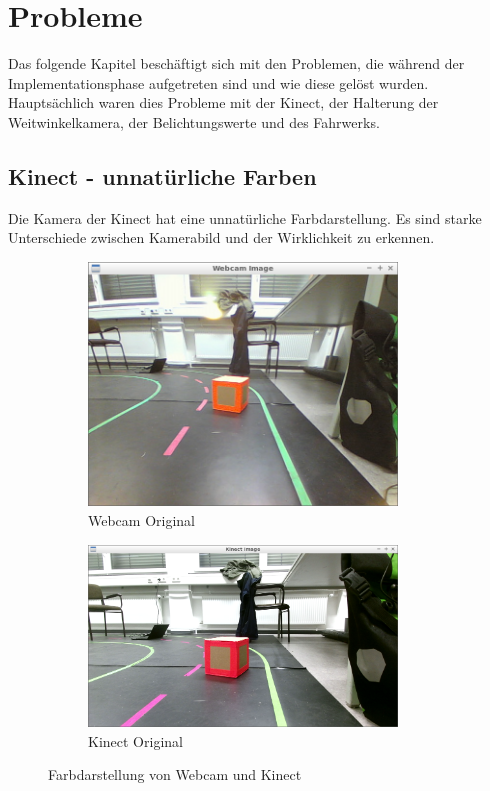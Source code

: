 \section{Probleme}
\label{cha:Probleme}
Das folgende Kapitel beschäftigt sich mit den Problemen, die während der Implementationsphase aufgetreten sind und wie diese gelöst wurden. Hauptsächlich waren dies Probleme mit der Kinect, der Halterung der Weitwinkelkamera, der Belichtungswerte und des Fahrwerks.

\subsection{Kinect - unnatürliche Farben}
\label{sec:farben}
Die Kamera der Kinect hat eine unnatürliche Farbdarstellung.
Es sind starke Unterschiede zwischen Kamerabild und der Wirklichkeit zu erkennen.

\begin{figure}[ht]
	\centering
	\begin{subfigure}{0.45\textwidth}
		\centering
		\includegraphics[width=0.9\textwidth]{images/Webcam_RAW.png}
		\caption{Webcam Original}
	\end{subfigure}
	\begin{subfigure}{0.45\textwidth}
		\centering
		\includegraphics[width=0.9\textwidth]{images/Kinect_qHD_RAW.png}
		\caption{Kinect Original}
	\end{subfigure}
	\caption{Farbdarstellung von Webcam und Kinect}
\end{figure}

